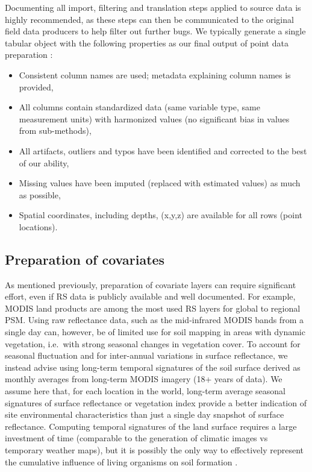 \documentclass[graybox,natbib,nospthms,UStrade]{svmono}
\begin{document}
Documenting all import, filtering and translation steps applied to
source data is highly recommended, as these steps can then be
communicated to the original field data producers to help filter out
further bugs. We typically generate a single tabular object with the
following properties as our final output of point data preparation :

\begin{itemize}
\item
  Consistent column names are used; metadata explaining column names
  is provided,
\item
  All columns contain standardized data (same variable type, same
  measurement units) with harmonized values (no significant bias in
  values from sub-methods),
\item
  All artifacts, outliers and typos have been identified and corrected
  to the best of our ability,
\item
  Missing values have been imputed (replaced with estimated values) as
  much as possible,
\item
  Spatial coordinates, including depths, (x,y,z) are available for all
  rows (point locations).
\end{itemize}

\hypertarget{preparation-of-covariates}{%
\subsection{Preparation of covariates}\label{preparation-of-covariates}}

As mentioned previously, preparation of covariate layers can require
significant effort, even if RS data is publicly available and well
documented. For example, MODIS land products are among the most used RS
layers for global to regional PSM. Using raw reflectance data, such as
the mid-infrared MODIS bands from a single day can, however, be of
limited use for soil mapping in areas with dynamic vegetation, i.e.~with
strong seasonal changes in vegetation cover. To account for seasonal
fluctuation and for inter-annual variations in surface reflectance, we
instead advise using long-term temporal signatures of the soil surface
derived as monthly averages from long-term MODIS imagery (18+ years of
data). We assume here that, for each location in the world, long-term
average seasonal signatures of surface reflectance or vegetation index
provide a better indication of site environmental characteristics than
just a single day snapshot of surface reflectance. Computing temporal
signatures of the land surface requires a large investment of time
(comparable to the generation of climatic images vs temporary weather
maps), but it is possibly the only way to effectively represent the cumulative
influence of living organisms on soil formation \citep{Hengl2017SoilGrids250m}.
\end{document}

